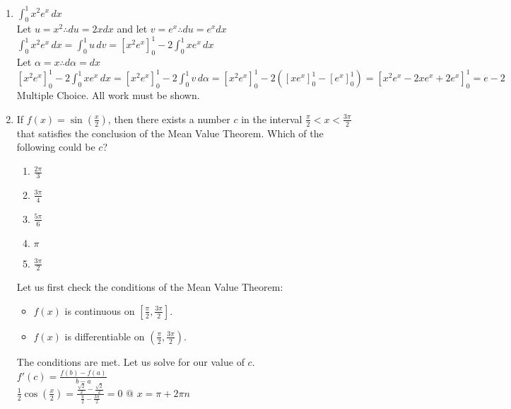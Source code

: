 \documentclass[10pt, letterpaper]{report}
\begin{document}
\begin{enumerate}
  \item{$\int_{0}^{1}{x^{2}e^{x}}\,dx$} \\

    Let $u=x^{2}\therefore du=2xdx$ and let $v=e^{x}\therefore du=e^{x}dx$ \\

    $\int_{0}^{1}{x^{2}e^{x}}\,dx=\int_{0}^{1}{u}\,dv=
    [x^{2}e^{x}]_{0}^{1}-2\int_{0}^{1}{xe^{x}}\,dx$ \\

    Let $\alpha=x\therefore d\alpha=dx$ \\

    $[x^{2}e^{x}]_{0}^{1}-2\int_{0}^{1}{xe^{x}}\,dx=
    [x^{2}e^{x}]_{0}^{1}-2\int_{0}^{1}{v}\,d\alpha=
    [x^{2}e^{x}]_{0}^{1}-2\left([xe^{x}]_{0}^{1}-[e^{x}]_{0}^{1}\right)=
    [x^{2}e^{x}-2xe^{x}+2e^{x}]_{0}^{1}=e-2$ \\

  \pagebreak
  Multiple Choice. All work must be shown.
  \item{If $f(x)=\sin{\left(\frac{x}{2}\right)}$, then there exists a number $c$ in the interval $\frac{\pi}{2}<x<\frac{3\pi}{2}$ that satisfies the conclusion of the Mean Value Theorem. Which of the following could be $c$?}
    \begin{enumerate}
      \item{$\frac{2\pi}{3}$}
      \item{$\frac{3\pi}{4}$}
      \item{$\frac{5\pi}{6}$}
      \item{$\pi$}
      \item{$\frac{3\pi}{2}$} \\
    \end{enumerate}

    Let us first check the conditions of the Mean Value Theorem:
    \begin{itemize}
      \item{$f(x)$ is continuous on $[\frac{\pi}{2}, \frac{3\pi}{2}]$.}
      \item{$f(x)$ is differentiable on $(\frac{\pi}{2}, \frac{3\pi}{2})$.}
    \end{itemize}
    The conditions are met. Let us solve for our value of $c$. \\

    $f'(c)=\frac{f(b)-f(a)}{b-a}$ \\

    $\frac{1}{2}\cos{\left(\frac{x}{2}\right)}=\frac{\frac{\sqrt{2}}{2}-\frac{\sqrt{2}}{2}}{\frac{\pi}{2}-\frac{3\pi}{2}}=0\,\,@\,\,x=\pi+2\pi n$ \\


\end{enumerate}
\end{document}
